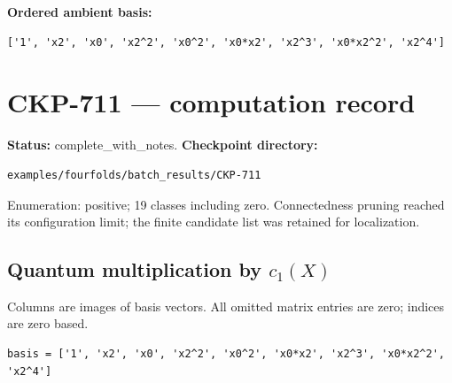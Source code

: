 \documentclass[10pt,a4paper]{article}
\begin{document}
\textbf{Ordered ambient basis:}
\begin{lstlisting}
['1', 'x2', 'x0', 'x2^2', 'x0^2', 'x0*x2', 'x2^3', 'x0*x2^2', 'x2^4']
\end{lstlisting}

\clearpage\section*{CKP-711 --- computation record}
\textbf{Status:} complete\_with\_notes.
\textbf{Checkpoint directory:}
\begin{lstlisting}
examples/fourfolds/batch_results/CKP-711
\end{lstlisting}

Enumeration: positive; 19 classes including zero.
Connectedness pruning reached its configuration limit; the finite candidate list was retained for localization.
\subsection*{Quantum multiplication by $c_1(X)$}
Columns are images of basis vectors. All omitted matrix entries are zero; indices are zero based.

\begin{lstlisting}
basis = ['1', 'x2', 'x0', 'x2^2', 'x0^2', 'x0*x2', 'x2^3', 'x0*x2^2', 'x2^4']
\end{lstlisting}
\end{document}
